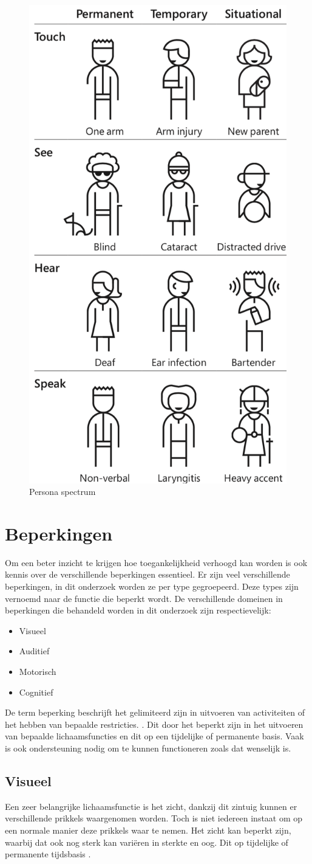 \begin{figure}[h]
    \centering
    \label{fig:personaSpect}
    \includegraphics[width=0.3\linewidth]{img/doelgroep_situatie_tijdelijk}
    \caption{Persona spectrum \autocite{inclusiveMicrosoft}}
\end{figure}





\section{Beperkingen}
\label{sec:beperkingen}
Om een beter inzicht te krijgen hoe toegankelijkheid verhoogd kan worden is ook kennis over de verschillende beperkingen essentieel. Er zijn veel verschillende beperkingen, in dit onderzoek worden ze per type gegroepeerd. Deze types zijn vernoemd naar de functie die beperkt wordt. De verschillende domeinen in beperkingen die behandeld worden in dit onderzoek zijn respectievelijk:
\begin{itemize}
    \item Visueel
    \item Auditief
     \item Motorisch
     \item Cognitief
    \end{itemize}


De term beperking beschrijft het gelimiteerd zijn in uitvoeren van activiteiten of het hebben van bepaalde restricties. \autocite{whoDis2019}. Dit door het beperkt zijn in het uitvoeren van bepaalde lichaamsfuncties en dit op een tijdelijke of permanente basis. Vaak is ook ondersteuning nodig om te kunnen functioneren zoals dat wenselijk is.

\subsection{Visueel}
\label{sec:Visueel}
Een zeer belangrijke lichaamsfunctie is het zicht, dankzij dit zintuig kunnen er verschillende prikkels waargenomen worden. Toch is niet iedereen instaat om op een normale manier deze prikkels waar te nemen. Het zicht kan beperkt zijn, waarbij dat ook nog sterk kan variëren in sterkte en oog. Dit op tijdelijke of permanente tijdsbasis \autocite{accessibility2019}.

